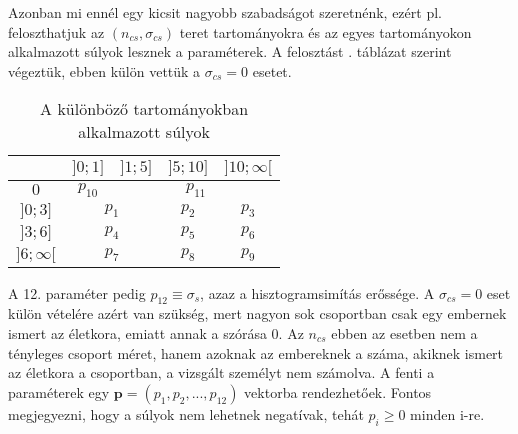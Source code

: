 \documentclass[12pt]{article}
\begin{document}
Azonban mi ennél egy kicsit nagyobb szabadságot szeretnénk, ezért pl. feloszthatjuk az $(n_{cs}, \sigma_{cs})$ teret tartományokra és az egyes tartományokon alkalmazott súlyok lesznek a paraméterek. A felosztást . táblázat szerint végeztük, ebben külön vettük a $\sigma_{cs} = 0$ esetet.
\begin{table}[H]
	\centering
	\begin{tabular}{|c|c|c|c|c|}
		\hline
		\diagbox{$\sigma_{cs}$}{$n_{cs}$} & $]0;1]$ & $]1;5]$ & $]5;10]$ & $]10;\infty[$  \\
		\hline
		$0$ & $p_{10}$ & \multicolumn{3}{|c|}{$p_{11}$} \\
		\hline
		$]0;3]$ & \multicolumn{2}{|c|}{$p_1$} & $p_2$ & $p_3$ \\
		\hline
		$]3;6]$ & \multicolumn{2}{|c|}{$p_4$} & $p_5$ & $p_6$ \\
		\hline
		$]6;\infty[$  & \multicolumn{2}{|c|}{$p_7$} & $p_8$ & $p_9$ \\
		\hline
	\end{tabular}
	\caption{A különböző tartományokban alkalmazott súlyok}
	\label{felosztas}
\end{table}
\noindent
A 12. paraméter pedig $p_{12} \equiv \sigma_s$, azaz a hisztogramsimítás erőssége. A $\sigma_{cs} = 0$ eset külön vételére azért van szükség, mert nagyon sok csoportban csak egy embernek ismert az életkora, emiatt annak a szórása $0$. Az $n_{cs}$ ebben az esetben nem a tényleges csoport méret, hanem azoknak az embereknek a száma, akiknek ismert az életkora a csoportban, a vizsgált személyt nem számolva.
A fenti a paraméterek egy $\mathbf{p} = (p_1, p_2, ..., p_{12})$ vektorba rendezhetőek. Fontos megjegyezni, hogy a súlyok nem lehetnek negatívak, tehát $p_i \ge 0$ minden i-re.
\end{document}
